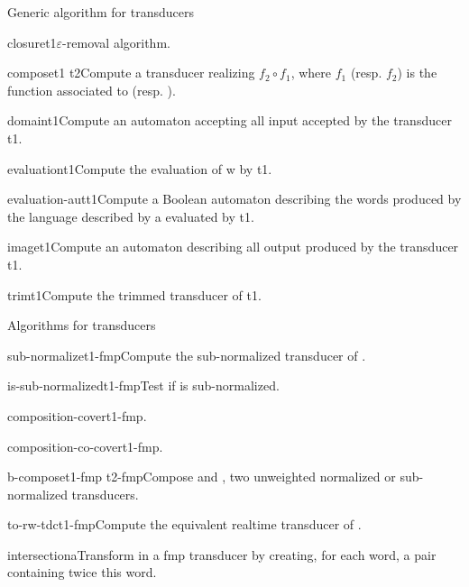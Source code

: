 \begin{fnsection}{Generic algorithm for transducers}
\item{closure}{t1}{$\varepsilon$-removal algorithm.}

\item{compose}{t1 t2}{Compute a transducer realizing $f_2 \circ f_1$,
    where $f_1$ (resp. $f_2$) is the function associated to 
    (resp. ).}

\item{domain}{t1}{Compute an automaton accepting all input accepted by
    the transducer t1.}

\item{evaluation}{t1}{Compute the evaluation of w by t1.}

\item{evaluation-aut}{t1}{Compute a Boolean automaton describing the
    words produced by the language described by a evaluated by t1.}

\item{image}{t1}{Compute an automaton describing all output produced
    by the transducer t1.}


\item{trim}{t1}{Compute the trimmed transducer of t1.}  \hline
\end{fnsection}

\begin{fnsection}{Algorithms for transducers}
\item{sub-normalize}{t1-fmp}{Compute the sub-normalized transducer of
    .}
\item{is-sub-normalized}{t1-fmp}{Test if  is
    sub-normalized.}
\item{composition-cover}{t1-fmp}{.}%
\item{composition-co-cover}{t1-fmp}{.}%
\item{b-compose}{t1-fmp t2-fmp}{Compose  and
    , two unweighted normalized or sub-normalized
    transducers.}
\item{to-rw-tdc}{t1-fmp}{Compute the equivalent realtime transducer
    of .}
\item{intersection}{a}{Transform  in a fmp transducer by
    creating, for each word, a pair containing twice this word.}
  \hline
\end{fnsection}


